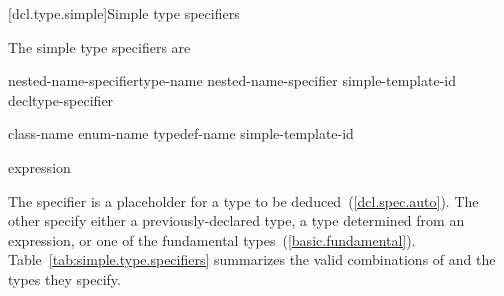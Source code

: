 [dcl.type.simple]{Simple type specifiers}%

\pnum
The simple type specifiers are

\begin{bnf}
\br
    nested-name-specifier\opt type-name\br
    nested-name-specifier  simple-template-id\br
    \br
    \br
    \br
    \br
    \br
    \br
    \br
    \br
    \br
    \br
    \br
    \br
    \br
    \br
    decltype-specifier
\end{bnf}

\begin{bnf}
\br
    class-name\br
    enum-name\br
    typedef-name\br
    simple-template-id
\end{bnf}

\begin{bnf}
\br
   \terminal{(} expression \terminal{)}\br
   \terminal{(}  \terminal{)}
\end{bnf}

\pnum
{}%
%
%
%
%
%
%
%
%
%
%
%
%
%
%
%
%
The  specifier is a placeholder for a type to be
deduced~(\ref{dcl.spec.auto}).
The other
specify either a previously-declared type, a type determined from an
expression, or one of the
fundamental types~(\ref{basic.fundamental}).
Table~\ref{tab:simple.type.specifiers}
 summarizes the valid combinations of
and the types they specify.

